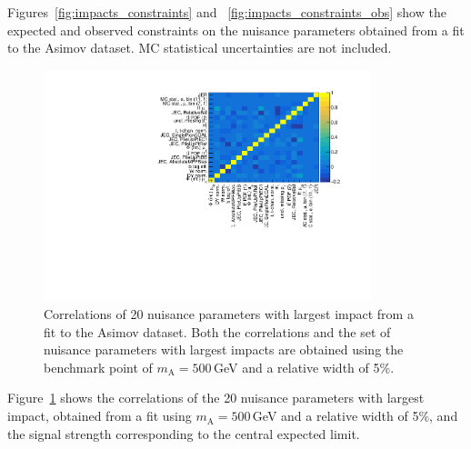 Figures~\ref{fig:impacts_constraints} and ~\ref{fig:impacts_constraints_obs} show the expected and observed constraints on the nuisance parameters obtained from a fit to the Asimov dataset.
MC statistical uncertainties are not included.
\clearpage
\begin{figure}[!Hhtb]
\centering
\includegraphics[width=0.85\textwidth,keepaspectratio=true]{fig/app5/impacts/correlation.pdf}
\caption{Correlations of 20 nuisance parameters with largest impact from a fit to the Asimov dataset. Both the correlations and the set of nuisance parameters with largest impacts are obtained using the benchmark point of $m_\mathrm{A} = 500$\,GeV and a relative width of 5\%.}
\label{fig:impacts_correlations}
\end{figure}

Figure~\ref{fig:impacts_correlations} shows the correlations of the 20 nuisance parameters with largest impact, obtained from a fit using $m_\mathrm{A} = 500$\,GeV and a relative width of 5\%, and the signal strength corresponding to the central expected limit. 

\clearpage{\pagestyle{empty}\cleardoublepage}
